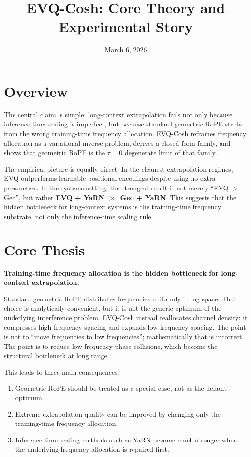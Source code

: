 \documentclass[11pt]{article}
\title{\textbf{EVQ-Cosh: Core Theory and Experimental Story}}
\author{}
\date{March 6, 2026}
\begin{document}
\maketitle

\section*{Overview}

The central claim is simple: long-context extrapolation fails not only because
inference-time scaling is imperfect, but because standard geometric RoPE starts
from the wrong training-time frequency allocation. EVQ-Cosh reframes frequency
allocation as a variational inverse problem, derives a closed-form family, and
shows that geometric RoPE is the $\tau=0$ degenerate limit of that family.

The empirical picture is equally direct. In the cleanest extrapolation regimes,
EVQ outperforms learnable positional encodings despite using no extra
parameters. In the systems setting, the strongest result is not merely
``EVQ $>$ Geo'', but rather \textbf{EVQ + YaRN $\gg$ Geo + YaRN}. This suggests
that the hidden bottleneck for long-context systems is the training-time
frequency substrate, not only the inference-time scaling rule.

\section*{Core Thesis}

\textbf{Training-time frequency allocation is the hidden bottleneck for
long-context extrapolation.}

Standard geometric RoPE distributes frequencies uniformly in log space. That
choice is analytically convenient, but it is not the generic optimum of the
underlying interference problem. EVQ-Cosh instead reallocates channel density:
it compresses high-frequency spacing and expands low-frequency spacing. The
point is not to ``move frequencies to low frequencies''; mathematically that is
incorrect. The point is to reduce low-frequency phase collisions, which become
the structural bottleneck at long range.

This leads to three main consequences:

\begin{enumerate}
  \item Geometric RoPE should be treated as a special case, not as the default optimum.
  \item Extreme extrapolation quality can be improved by changing only the training-time frequency allocation.
  \item Inference-time scaling methods such as YaRN become much stronger when the underlying frequency allocation is repaired first.
\end{enumerate}
\end{document}
